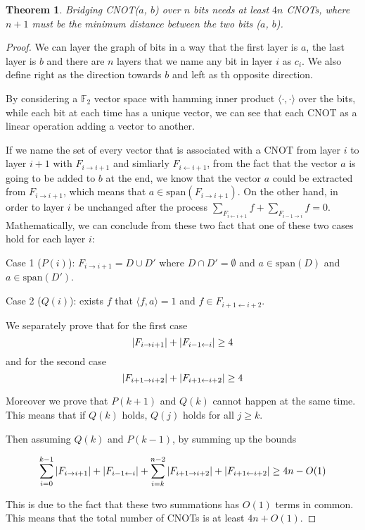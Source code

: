 \documentclass{report}
\newtheorem{theorem}{Theorem}
\begin{document}
\begin{theorem}
  Bridging CNOT($a$, $b$) over $n$ bits needs at least $4n$ CNOTs, where $n + 1$ must be the minimum distance between the two bits ($a$, $b$).
  \label{thm:bridging-cnot}
\end{theorem}
\begin{proof}
  We can layer the graph of bits in a way that the first layer is $a$, the last layer is $b$ and there are $n$ layers that we name any bit in layer $i$ as $c_i$. We also define right as the direction towards $b$ and left as th opposite direction.

  By considering a $\mathbb{F}_2$ vector space with hamming inner product $\langle \cdot, \cdot \rangle$ over the bits,  while each bit at each time has a unique vector, we can see that each CNOT as a linear operation adding a vector to another.

  If we name the set of every vector that is associated with a CNOT from layer $i$ to layer $i+1$ with $F_{i\rightarrow i+1}$ and simliarly $F_{i\leftarrow i+1}$, from the fact that the vector $a$ is going to be added to $b$ at the end, we know that the vector $a$ could be extracted from $F_{i\rightarrow i+1}$, which means that $a \in \mathrm{span}(F_{i\rightarrow i+1})$. On the other hand, in order to layer $i$ be unchanged after the process $\sum_{F_{i\leftarrow i+1}} f + \sum_{F_{i-1 \rightarrow i}} f = 0$.
  Mathematically, we can conclude from these two fact that one of these two cases hold for each layer $i$:

  Case 1 ($P(i)$): $F_{i\rightarrow i+1} = D \cup D'$ where $D \cap D' = \emptyset$ and $a \in \mathrm{span}(D)$ and $a \in \mathrm{span}(D')$.

  Case 2 ($Q(i)$): exists $f$ that $\langle f, a\rangle = 1$ and $f \in F_{i+1 \leftarrow i+2}$. 

  We separately prove that for the first case 
  \begin{equation}
    \abs{F_{i \rightarrow i+1}} + \abs{F_{i-1 \leftarrow i}} \geq 4
  \end{equation}
  and for the second case
  \begin{equation}
    \abs{F_{i+1 \rightarrow i+2}} + \abs{F_{i+1 \leftarrow i+2}} \geq 4
  \end{equation}

  Moreover we prove that $P(k+1)$ and $Q(k)$ cannot happen at the same time. This means that if $Q(k)$ holds, $Q(j)$ holds for all $j \geq k$.

  Then assuming $Q(k)$ and $P(k-1)$, by summing up the bounds

  \begin{equation}
    \sum_{i=0}^{k-1} \abs{F_{i \rightarrow i+1}} + \abs{F_{i-1 \leftarrow i}} + \sum_{i=k}^{n-2} \abs{F_{i+1 \rightarrow i+2}} + \abs{F_{i+1 \leftarrow i+2}} \geq 4n - O(1)
  \end{equation}

  This is due to the fact that these two summations has $O(1)$ terms in common. This means that the total number of CNOTs is at least $4n + O(1)$.
\end{proof}
\end{document}
